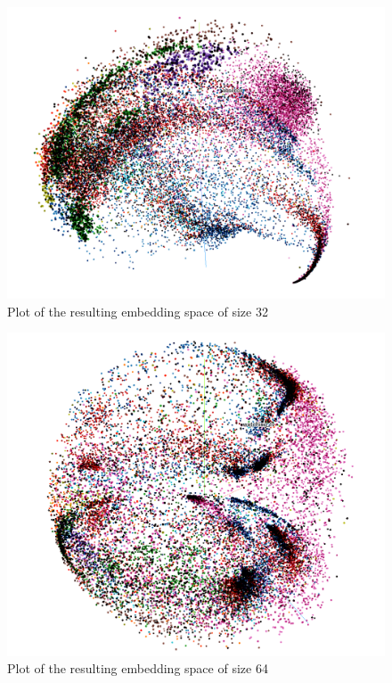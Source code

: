 \documentclass[twocolumn]{article}
\begin{document}
\begin{figure}[t]
\centering
    \includegraphics[width=\linewidth]{assets/embedding_space_32.png}
    \caption{Plot of the resulting embedding space of size 32}
    \label{fig:embedding-space-32}
\end{figure}

\begin{figure}[t]
\centering
    \includegraphics[width=\linewidth]{assets/embedding_space_64.png}
    \caption{Plot of the resulting embedding space of size 64}
    \label{fig:embedding-space-64}
\end{figure}
\end{document}
